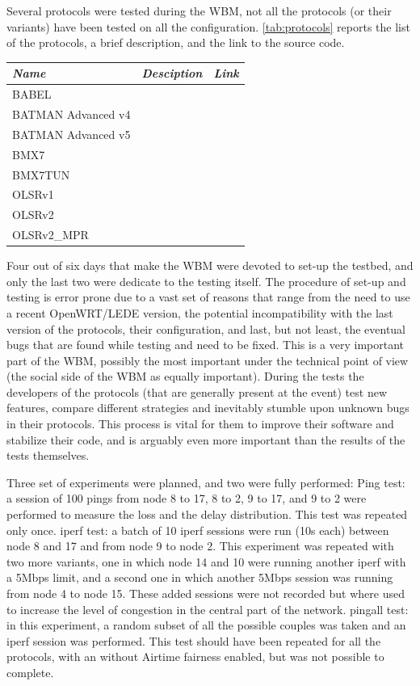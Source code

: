 \documentclass[10pt,onecolumn]{paper}
\begin{document}
Several protocols were tested during the WBM, not all the protocols (or their
variants) have been tested on all the configuration. \cref{tab:protocols}
reports the list of the protocols, a brief description, and the link to the
source code. 

\begin{table}
    \centering
    \begin{tabular}{lll}
        \emph{Name} & \emph{Desciption} & \emph{Link} \\
        \midrule
        BABEL & & \\
        BATMAN Advanced v4 & & \\
        BATMAN Advanced v5 & & \\
        BMX7  & & \\
        BMX7TUN  & & \\
        OLSRv1 & & \\
        OLSRv2 & & \\
        OLSRv2\_MPR & & \\
        \bottomrule
    \end{tabular}
\end{table}

Four out of six days that make the WBM were devoted to set-up the testbed, and
only the last two were dedicate to the testing itself. The procedure of set-up
and testing is error prone due to a vast set of reasons that range from the need
to use a recent OpenWRT/LEDE version, the potential incompatibility with the
last version of the protocols, their configuration, and last, but not least, the
eventual bugs that are found while testing and need to be fixed. This is a very
important part of the WBM, possibly the most important under the technical
point of view (the social side of the WBM as equally important). During the
tests the developers of the protocols (that are generally present at the event)
test new features, compare different strategies and inevitably stumble upon
unknown bugs in their protocols. This process is vital for them to improve their
software and stabilize their code, and is arguably even more important than the
results of the tests themselves. 

Three set of experiments were planned, and two were fully performed:
\bi
\ii Ping test: a session of 100 pings from node 8 to 17, 8 to 2, 9 to 17, and 9
to 2 were performed to measure the loss and the delay distribution. This test
was repeated only once.
\ii iperf test: a batch of 10 iperf sessions were run (10s each) between node 8
and 17 and from node 9 to node 2. This experiment was repeated with two more
variants, one in which node 14 and 10 were running another iperf with a 5Mbps
limit, and a second one in which another 5Mbps session was running from node 4
to node 15. These added sessions were not recorded but where used to increase
the level of congestion in the central part of the network.
\ii pingall test: in this experiment, a random subset of all the possible
couples was taken and an iperf session was performed. This test should have been
repeated for all the protocols, with an without Airtime fairness enabled, but
was not possible to complete.
\ei
\end{document}
